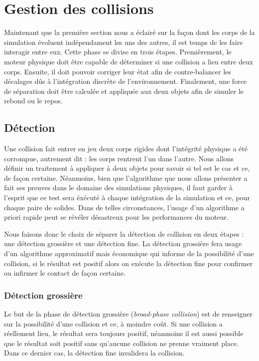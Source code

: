 \section{Gestion des collisions}

Maintenant que la première section nous a éclairé sur la façon dont
les corps de la simulation évoluent indépendament les uns des autres,
il est temps de les faire interagir entre eux. Cette phase se divise
en trois étapes. Premièrement, le moteur physique doit être capable de
déterminer si une collision a lieu entre deux corps. Ensuite, il doit
pouvoir corriger leur état afin de contre-balancer les décalages dûs à
l'intégration discrète de l'environnement. Finalement, une force de
séparation doit être calculée et appliquée aux deux objets afin de
simuler le rebond ou le repos.

\subsection{Détection}

Une collision fait entrer en jeu deux corps rigides dont l'intégrité
physique a été corrompue, autrement dit : les corps rentrent l'un dans
l'autre. Nous allons définir un traitement à appliquer à deux objets
pour savoir si tel est le cas et ce, de façon certaine. Néanmoins,
bien que l'algorithme que nous allons présenter a fait ses preuves
dans le domaine des simulations physiques, il faut garder à l'esprit
que ce test sera éxécuté à chaque intégration de la simulation et ce,
pour chaque paire de solides. Dans de telles circonstances, l'usage
d'un algorithme a priori rapide peut se révéler désastreux pour les
performances du moteur.

Nous faisons donc le choix de séparer la détection de collision en
deux étapes : une détection grossière et une détection fine. La
détection grossière fera usage d'un algorithme approximatif mais
économique qui informe de la possibilité d'une collision, si le
résultat est positif alors on exécute la détection fine pour confirmer
ou infirmer le contact de façon certaine.

\subsubsection{Détection grossière}

Le but de la phase de détection grossière (\textit{broad-phase
  collision}) est de renseigner sur la possibilité d'une collision et
ce, à moindre coût. Si une collision a réellement lieu, le résultat
sera toujours positif, néanmoins il est aussi possible que le résultat
soit positif sans qu'aucune collision ne prenne vraiment place. Dans
ce dernier cas, la détection fine invalidera la collision.

